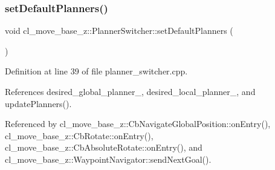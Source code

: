 \subsubsection{\texorpdfstring{set\+Default\+Planners()}{setDefaultPlanners()}}
{\footnotesize\ttfamily void cl\+\_\+move\+\_\+base\+\_\+z\+::\+Planner\+Switcher\+::set\+Default\+Planners (\begin{DoxyParamCaption}{ }\end{DoxyParamCaption})}



Definition at line 39 of file planner\+\_\+switcher.\+cpp.



References desired\+\_\+global\+\_\+planner\+\_\+, desired\+\_\+local\+\_\+planner\+\_\+, and update\+Planners().



Referenced by cl\+\_\+move\+\_\+base\+\_\+z\+::\+Cb\+Navigate\+Global\+Position\+::on\+Entry(), cl\+\_\+move\+\_\+base\+\_\+z\+::\+Cb\+Rotate\+::on\+Entry(), cl\+\_\+move\+\_\+base\+\_\+z\+::\+Cb\+Absolute\+Rotate\+::on\+Entry(), and cl\+\_\+move\+\_\+base\+\_\+z\+::\+Waypoint\+Navigator\+::send\+Next\+Goal().


